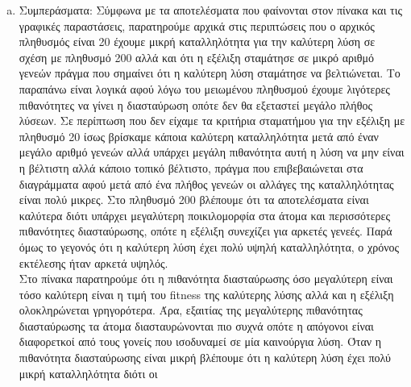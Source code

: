 \documentclass[12pt,a4paper]{article}
\newcommand{\tl}{\textlatin}
\begin{document}
\begin{enumerate}[a)]
\begin{figure}[H]
\begin{subfigure}[ht]{0.7\textwidth}
                         \caption*{Περίπτωση: 200, 0.1 ,0.01}
                     \end{subfigure}
                \end{figure} 
            \item Συμπεράσματα: 
                    Σύμφωνα με τα αποτελέσματα που 
                    φαίνονται στον πίνακα και τις γραφικές παραστάσεις, παρατηρούμε αρχικά
                    στις περιπτώσεις που ο αρχικός πληθυσμός
                    είναι 20 έχουμε  μικρή καταλληλότητα για την καλύτερη λύση
                    σε σχέση με πληθυσμό 200 αλλά και
                    ότι η εξέλιξη σταμάτησε σε μικρό αριθμό
                    γενεών πράγμα που σημαίνει ότι η καλύτερη λύση σταμάτησε να βελτιώνεται.
                    Το παραπάνω είναι λογικά αφού λόγω του μειωμένου
                    πληθυσμού έχουμε λιγότερες πιθανότητες να γίνει η διασταύρωση
                    οπότε δεν θα εξεταστεί μεγάλο πλήθος λύσεων. Σε περίπτωση 
                    που δεν είχαμε τα κριτήρια σταματήμου για
                    την εξέλιξη με πληθυσμό 20 ίσως βρίσκαμε κάποια καλύτερη καταλληλότητα
                    μετά από έναν μεγάλο αριθμό γενεών αλλά υπάρχει μεγάλη
                    πιθανότητα αυτή η λύση να μην είναι η βέλτιστη αλλά κάποιο
                    τοπικό βέλτιστο, πράγμα που επιβεβαιώνεται στα διαγράμματα
                    αφού μετά από ένα πλήθος γενεών οι αλλάγες της
                    καταλληλότητας είναι πολύ μικρες. Στο
                    πληθυσμό 200 βλέπουμε ότι τα αποτελέσματα είναι καλύτερα διότι υπάρχει 
                    μεγαλύτερη ποικιλομορφία στα άτομα και περισσότερες
                    πιθανότητες διασταύρωσης, οπότε η
                    εξέλιξη συνεχίζει για αρκετές γενεές. Παρά όμως το γεγονός
                    ότι η καλύτερη λύση έχει πολύ υψηλή καταλληλότητα, ο χρόνος
                    εκτέλεσης ήταν αρκετά υψηλός.\\
                    Στο πίνακα παρατηρούμε ότι η πιθανότητα
                    διασταύρωσης όσο μεγαλύτερη είναι τόσο καλύτερη είναι η τιμή του
                    \tl{fitness} της καλύτερης λύσης αλλά και
                    η εξέλιξη ολοκληρώνεται γρηγορότερα. Άρα, εξαιτίας της μεγαλύτερης
                    πιθανότητας διασταύρωσης τα άτομα 
                    διασταυρώνονται πιο συχνά οπότε η απόγονοι είναι
                    διαφορετκοί από τους γονείς που ισοδυναμεί σε μία
                    καινούργια
                    λύση. Όταν η πιθανότητα διασταύρωσης είναι μικρή βλέπουμε ότι
                    η καλύτερη λύση έχει πολύ μικρή καταλληλότητα διότι οι

\end{enumerate}
\end{document}
